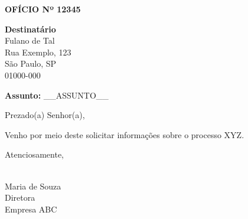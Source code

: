 \documentclass{article}
\begin{document}
\begin{center}
    \textbf{OFÍCIO Nº 12345}
\end{center}

\vspace{1cm}

\begin{flushright}
    \textbf{Destinatário} \\
    Fulano de Tal \\
    Rua Exemplo, 123 \\
    São Paulo, SP \\
    01000-000
\end{flushright}

\vspace{1cm}

\textbf{Assunto:} __ASSUNTO__

\vspace{1cm}

Prezado(a) Senhor(a),

\bigskip

Venho por meio deste solicitar informações sobre o processo XYZ.

\bigskip

Atenciosamente,

\vspace{1cm}

\hrulefill \\
Maria de Souza \\
Diretora \\
Empresa ABC \\
\end{document}
